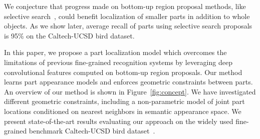 We conjecture that progress made on bottom-up region proposal methods, like selective search~\cite{selsearch}, could benefit localization of smaller parts in addition to whole objects.
As we show later, average recall of parts using selective search proposals is 95\% on the Caltech-UCSD bird dataset.

In this paper, we propose a part localization model which overcomes the limitations of previous fine-grained recognition systems by leveraging deep convolutional features computed on bottom-up region proposals.
Our method learns part appearance models and enforces geometric constraints between parts.
An overview of our method is shown in Figure~\ref{fig:concept}. We have investigated different geometric constraints, including a non-parametric model of joint part locations conditioned on nearest neighbors in semantic appearance space.
We present state-of-the-art results evaluating our approach on the widely used fine-grained benchmark Caltech-UCSD bird dataset~\cite{DatasetCUB200}.

% 
%
%
